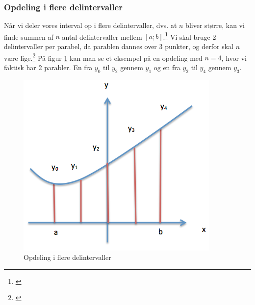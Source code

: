 \documentclass[12pt]{article}
\numberwithin{equation}{section}
\begin{document}

\subsubsection{Opdeling i flere delintervaller}
Når vi deler vores interval op i flere delintervaller, dvs. at $n$ bliver større, kan vi finde summen af $n$ antal delintervaller mellem $[a;b]$.\footnote{\cite[s. 15-16]{2012matA}} Vi skal bruge 2 delintervaller per parabel, da parablen dannes over 3 punkter, og derfor skal $n$ være lige.\footnote{\cite[s. 15-16]{2012matA}} På figur \ref{fig:simpsonOpdeling} kan man se et eksempel på en opdeling med $n=4$, hvor vi faktisk har 2 parabler. En fra $y_0$ til $y_2$ gennem $y_1$ og en fra $y_2$ til $y_4$ gennem $y_3$.
\label{sec:simpsonopdeling}
\begin{figure}[H]
\centering
\includegraphics[width=0.6\linewidth]{Billeder/simpsonOpdeling}
\caption{Opdeling i flere delintervaller}
\label{fig:simpsonOpdeling}
\end{figure}
\end{document}

